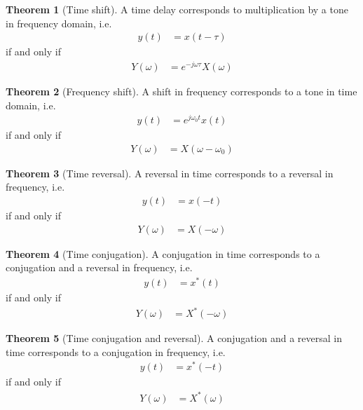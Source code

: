 \documentclass[titlepage, fleqn, a4paper, 12pt, twoside]{article}
\theoremstyle{definition}
\theoremstyle{theorem}
\newtheorem{theorem}{Theorem}
\begin{document}
\begin{theorem}[Time shift]
	A time delay corresponds to multiplication by a tone in frequency domain, i.e.
	\begin{align*}
		y(t) &= x(t - \tau)
	\end{align*}
	if and only if
	\begin{align*}
		Y(\omega) &= e^{-j \omega \tau} X(\omega)
	\end{align*}
	\label{thm:time_shift}
\end{theorem}

\begin{theorem}[Frequency shift]
	A shift in frequency corresponds to a tone in time domain, i.e.
	\begin{align*}
		y(t) &= e^{j \omega_0 t} x(t)
	\end{align*}
	if and only if
	\begin{align*}
		Y(\omega) &= X(\omega - \omega_0)
	\end{align*}
	\label{thm:frequency_shift}
\end{theorem}

\begin{theorem}[Time reversal]
	A reversal in time corresponds to a reversal in frequency, i.e.
	\begin{align*}
		y(t) &= x(-t)
	\end{align*}
	if and only if
	\begin{align*}
		Y(\omega) &= X(-\omega)
	\end{align*}
	\label{thm:time_reversal}
\end{theorem}

\begin{theorem}[Time conjugation]
	A conjugation in time corresponds to a conjugation and a reversal in frequency, i.e.
	\begin{align*}
		y(t) &= x^*(t)
	\end{align*}
	if and only if
	\begin{align*}
		Y(\omega) &= X^*(-\omega)
	\end{align*}
	\label{thm:time_conjugation}
\end{theorem}

\begin{theorem}[Time conjugation and reversal]
	A conjugation and a reversal in time corresponds to a conjugation in frequency, i.e.
	\begin{align*}
		y(t) &= x^*(-t)
	\end{align*}
	if and only if
	\begin{align*}
		Y(\omega) &= X^*(\omega)
	\end{align*}
	\label{thm:time_conjugation}
\end{theorem}
\end{document}
